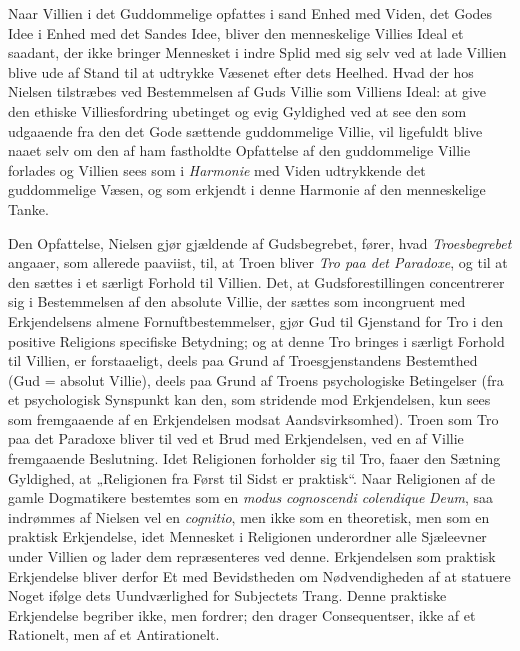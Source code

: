 \documentclass[12pt,a4paper]{book}
\newcommand{\opage}[1]{\marginnote{\footnotesize\textit{[#1]}}}
\begin{document}
Naar Villien i det Guddommelige opfattes i sand Enhed med Viden, det Godes Idee i Enhed med
det Sandes Idee, bliver den menneskelige Villies Ideal et saadant, der ikke bringer
Mennesket i indre Splid med sig selv ved at lade Villien blive ude af Stand til at udtrykke
Væsenet efter dets Heelhed. Hvad der hos Nielsen tilstræbes ved Bestemmelsen af Guds Villie
som Villiens Ideal: at give den ethiske Villiesfordring ubetinget og evig Gyldighed ved at
see den som udgaaende fra den det Gode sættende guddommelige Villie, vil ligefuldt blive
naaet selv om den af \opage{168}ham fastholdte Opfattelse af den guddommelige Villie forlades og Villien
sees som i \emph{Harmonie} med Viden udtrykkende det guddommelige Væsen, og som erkjendt i denne
Harmonie af den menneskelige Tanke.

Den Opfattelse, Nielsen gjør gjældende af Gudsbegrebet, fører, hvad \emph{Troesbegrebet} angaaer,
som allerede paaviist, til, at Troen bliver \emph{Tro paa det Paradoxe}, og til at den sættes
i et særligt Forhold til Villien. Det, at Gudsforestillingen concentrerer sig i Bestemmelsen
af den absolute Villie, der sættes som incongruent med Erkjendelsens almene
Fornuftbestemmelser, gjør Gud til Gjenstand for Tro i den positive Religions specifiske
Betydning; og at denne Tro bringes i særligt Forhold til Villien, er forstaaeligt, deels paa
Grund af Troesgjenstandens Bestemthed (Gud = absolut Villie), deels paa Grund af Troens
psychologiske Betingelser (fra et psychologisk Synspunkt kan den, som stridende mod
Erkjendelsen, kun sees som fremgaaende af en Erkjendelsen modsat Aandsvirksomhed). Troen som
Tro paa det Paradoxe bliver til ved et Brud med Erkjendelsen, ved en af Villie fremgaaende
Beslutning. Idet Religionen forholder sig til Tro, faaer den Sætning Gyldighed, at
„Religionen fra Først til Sidst er praktisk“. Naar Religionen af de gamle Dogmatikere
bestemtes som en \textit{modus} \emph{\textit{cognoscendi colendique}} \textit{Deum}, saa indrømmes af Nielsen vel en
\textit{cognitio}, men ikke som en theoretisk, men som en praktisk Erkjendelse, idet
Mennesket i Religionen underordner alle Sjæleevner under Villien og lader dem repræsenteres
ved denne. Erkjendelsen som praktisk Erkjendelse bliver derfor Et med Bevidstheden om
Nødvendigheden af at statuere Noget ifølge dets Uundværlighed for Subjectets Trang. Denne
praktiske Erkjendelse begriber ikke, men fordrer; den drager Consequentser, ikke af et
Rationelt, men af et Antirationelt.
\end{document}
